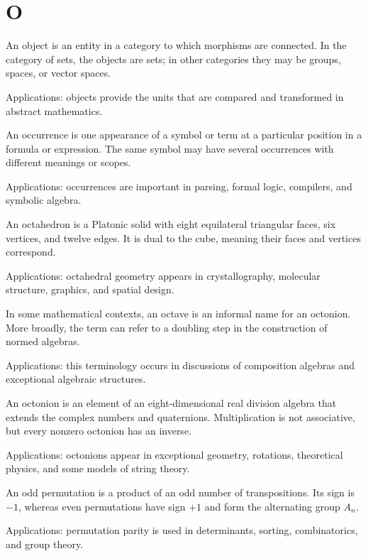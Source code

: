 \chapter*{O}
\label{chap:o}

An object is an entity in a category to which morphisms are connected. In the category of sets, the objects are sets; in other categories they may be groups, spaces, or vector spaces. \par\noindent Applications: objects provide the units that are compared and transformed in abstract mathematics.

An occurrence is one appearance of a symbol or term at a particular position in a formula or expression. The same symbol may have several occurrences with different meanings or scopes. \par\noindent Applications: occurrences are important in parsing, formal logic, compilers, and symbolic algebra.

An octahedron is a Platonic solid with eight equilateral triangular faces, six vertices, and twelve edges. It is dual to the cube, meaning their faces and vertices correspond. \par\noindent Applications: octahedral geometry appears in crystallography, molecular structure, graphics, and spatial design.

In some mathematical contexts, an octave is an informal name for an octonion. More broadly, the term can refer to a doubling step in the construction of normed algebras. \par\noindent Applications: this terminology occurs in discussions of composition algebras and exceptional algebraic structures.

An octonion is an element of an eight-dimensional real division algebra that extends the complex numbers and quaternions. Multiplication is not associative, but every nonzero octonion has an inverse. \par\noindent Applications: octonions appear in exceptional geometry, rotations, theoretical physics, and some models of string theory.

An odd permutation is a product of an odd number of transpositions. Its sign is $-1$, whereas even permutations have sign $+1$ and form the alternating group $A_n$. \par\noindent Applications: permutation parity is used in determinants, sorting, combinatorics, and group theory.

